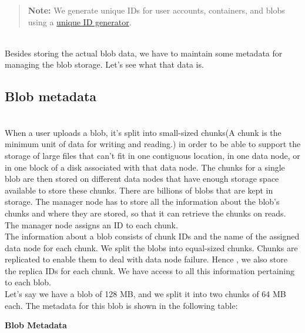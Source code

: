 \begin{quote}
\textbf{Note:} We generate unique IDs for user accounts, containers, and blobs using a \href{https://www.educative.io/courses/grokking-the-system-design-interview/design-of-a-unique-id-generator}{unique ID generator}.
\end{quote}
\\
Besides storing the actual blob data, we have to maintain some metadata for managing the blob storage. Let's see what that data is.

\subsection{Blob metadata}\label{cbHDnEH5ogq_EiqoKXK95}
\\
When a user uploads a blob, it's split into small-sized chunks(A chunk is the minimum unit of data for writing and reading.) in order to be able to support the storage of large files that can't fit in one contiguous location, in one data node, or in one block of a disk associated with that data node. The chunks for a single blob are then stored on different data nodes that have enough storage space available to store these chunks. There are billions of blobs that are kept in storage. The manager node has to store all the information about the blob's chunks and where they are stored, so that it can retrieve the chunks on reads. The manager node assigns an ID to each chunk.
\\
The information about a blob consists of chunk IDs and the name of the assigned data node for each chunk. We split the blobs into equal-sized chunks. Chunks are replicated to enable them to deal with data node failure. Hence , we also store the replica IDs for each chunk. We have access to all this information pertaining to each blob.
\\
Let's say we have a blob of 128 MB, and we split it into two chunks of 64 MB each. The metadata for this blob is shown in the following table:

\textbf{Blob Metadata}

\begin{table}[htbp]
\centering
\small
{}
\caption{Blob Metadata}
\end{table}

